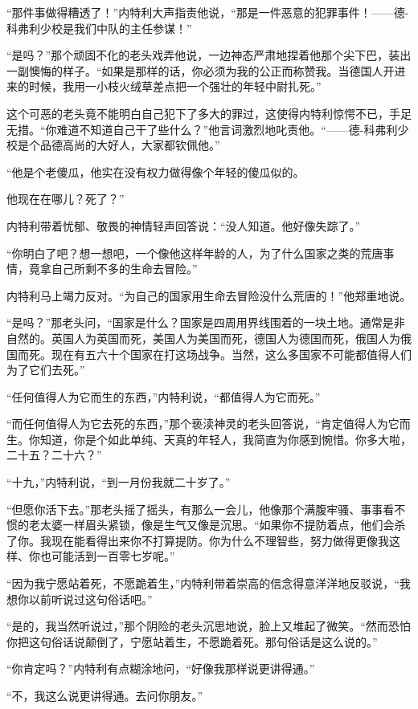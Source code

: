     “那件事做得糟透了！”内特利大声指责他说，“那是一件恶意的犯罪事件！——德-科弗利少校是我们中队的主任参谋！”

    “是吗？”那个顽固不化的老头戏弄他说，一边神态严肃地捏着他那个尖下巴，装出一副懊悔的样子。“如果是那样的话，你必须为我的公正而称赞我。当德国人开进来的时候，我用一小枝火绒草差点把一个强壮的年轻中尉扎死。”

    这个可恶的老头竟不能明白自己犯下了多大的罪过，这使得内特利惊愕不已，手足无措。“你难道不知道自己干了些什么？”他言词激烈地叱责他。“——德-科弗利少校是个品德高尚的大好人，大家都钦佩他。”

    “他是个老傻瓜，他实在没有权力做得像个年轻的傻瓜似的。

    他现在在哪儿？死了？”

    内特利带着忧郁、敬畏的神情轻声回答说：“没人知道。他好像失踪了。”

    “你明白了吧？想一想吧，一个像他这样年龄的人，为了什么国家之类的荒唐事情，竟拿自己所剩不多的生命去冒险。”

    内特利马上竭力反对。“为自己的国家用生命去冒险没什么荒唐的！”他郑重地说。

    “是吗？”那老头问，“国家是什么？国家是四周用界线围着的一块土地。通常是非自然的。英国人为英国而死，美国人为美国而死，德国人为德国而死，俄国人为俄国而死。现在有五六十个国家在打这场战争。当然，这么多国家不可能都值得人们为了它们去死。”

    “任何值得人为它而生的东西，”内特利说，“都值得人为它而死。”

    “而任何值得人为它去死的东西，”那个亵渎神灵的老头回答说，“肯定值得人为它而生。你知道，你是个如此单纯、天真的年轻人，我简直为你感到惋惜。你多大啦，二十五？二十六？”

    “十九，”内特利说，“到一月份我就二十岁了。”

    “但愿你活下去。”那老头摇了摇头，有那么一会儿，他像那个满腹牢骚、事事看不惯的老太婆一样眉头紧锁，像是生气又像是沉思。“如果你不提防着点，他们会杀了你。我现在能看得出来你不打算提防。你为什么不理智些，努力做得更像我这样、你也可能活到一百零七岁呢。”

    “因为我宁愿站着死，不愿跪着生，”内特利带着崇高的信念得意洋洋地反驳说，“我想你以前听说过这句俗话吧。”

    “是的，我当然听说过，”那个阴险的老头沉思地说，脸上又堆起了微笑。“然而恐怕你把这句俗话说颠倒了，宁愿站着生，不愿跪着死。那句俗话是这么说的。”

    “你肯定吗？”内特利有点糊涂地问，“好像我那样说更讲得通。”

    “不，我这么说更讲得通。去问你朋友。”

